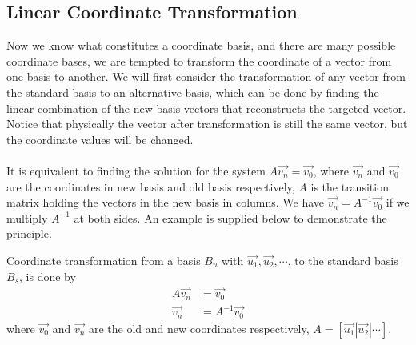\subsection{Linear Coordinate Transformation}
\label{seccoordinatetrans}
Now we know what constitutes a coordinate basis, and there are many possible coordinate bases, we are tempted to transform the coordinate of a vector from one basis to another. We will first consider the transformation of any vector from the standard basis to an alternative basis, which can be done by finding the linear combination of the new basis vectors that reconstructs the targeted vector. Notice that physically the vector after transformation is still the same vector, but the coordinate values will be changed.\\
\\
It is equivalent to finding the solution for the system $A\vec{v_n} = \vec{v_0}$, where $\vec{v_n}$ and $\vec{v_0}$ are the coordinates in new basis and old basis respectively, $A$ is the transition matrix holding the vectors in the new basis in columns. We have $\vec{v_n} = A^{-1}\vec{v_0}$ if we multiply $A^{-1}$ at both sides. An example is supplied below to demonstrate the principle.
\begin{proper}
\label{coordinatetrans}
Coordinate transformation from a basis $B_u$ with $\vec{u_1}, \vec{u_2}, \cdots$, to the standard basis $B_s$, is done by
\begin{align*}
A\vec{v_n} &= \vec{v_0} \\
\vec{v_n} &= A^{-1}\vec{v_0}
\end{align*}
where $\vec{v_0}$ and $\vec{v_n}$ are the old and new coordinates respectively, $A = [\vec{u_1}|\vec{u_2}|\cdots]$.
\end{proper}
